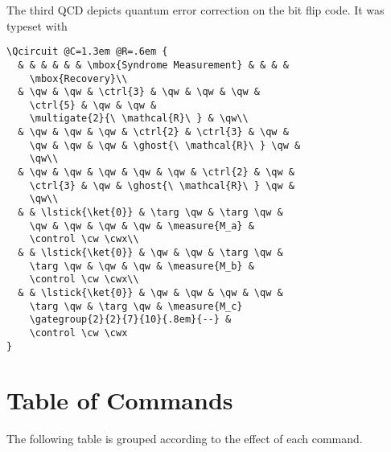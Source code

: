 \documentclass[twocolumn,nofootinbib]{revtex4}
\begin{document}
The third QCD depicts quantum error correction on the bit flip code.  It was typeset with
{\small \begin{verbatim}\Qcircuit @C=1.3em @R=.6em {
  & & & & & & \mbox{Syndrome Measurement} & & & &
    \mbox{Recovery}\\
  & \qw & \qw & \ctrl{3} & \qw & \qw & \qw &
    \ctrl{5} & \qw & \qw &
    \multigate{2}{\ \mathcal{R}\ } & \qw\\
  & \qw & \qw & \qw & \ctrl{2} & \ctrl{3} & \qw &
    \qw & \qw & \qw & \ghost{\ \mathcal{R}\ } \qw &
    \qw\\
  & \qw & \qw & \qw & \qw & \qw & \ctrl{2} & \qw &
    \ctrl{3} & \qw & \ghost{\ \mathcal{R}\ } \qw &
    \qw\\
  & & \lstick{\ket{0}} & \targ \qw & \targ \qw &
    \qw & \qw & \qw & \qw & \measure{M_a} &
    \control \cw \cwx\\
  & & \lstick{\ket{0}} & \qw & \qw & \targ \qw &
    \targ \qw & \qw & \qw & \measure{M_b} &
    \control \cw \cwx\\
  & & \lstick{\ket{0}} & \qw & \qw & \qw & \qw &
    \targ \qw & \targ \qw & \measure{M_c}
    \gategroup{2}{2}{7}{10}{.8em}{--} &
    \control \cw \cwx
}
\end{verbatim}}

\pagebreak

\section{Table of Commands}

The following table is grouped according to the effect of each command.\\
\end{document}
